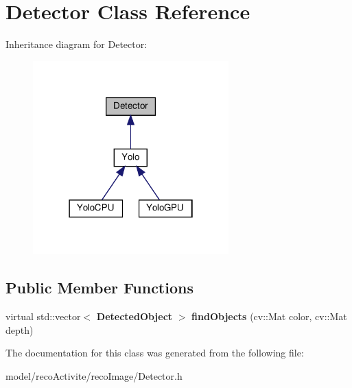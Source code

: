 \section{Detector Class Reference}
\label{class_detector}


Inheritance diagram for Detector\+:
\nopagebreak
\begin{figure}[H]
\begin{center}
\leavevmode
\includegraphics[width=214pt]{class_detector__inherit__graph}
\end{center}
\end{figure}
\subsection*{Public Member Functions}
\begin{DoxyCompactItemize}
\item 
\mbox{\label{class_detector_a608942d93773419f166a499be33bb7c1}} 
virtual std\+::vector$<$ \textbf{ Detected\+Object} $>$ {\bfseries find\+Objects} (cv\+::\+Mat color, cv\+::\+Mat depth)
\end{DoxyCompactItemize}


The documentation for this class was generated from the following file\+:\begin{DoxyCompactItemize}
\item 
model/reco\+Activite/reco\+Image/Detector.\+h\end{DoxyCompactItemize}
